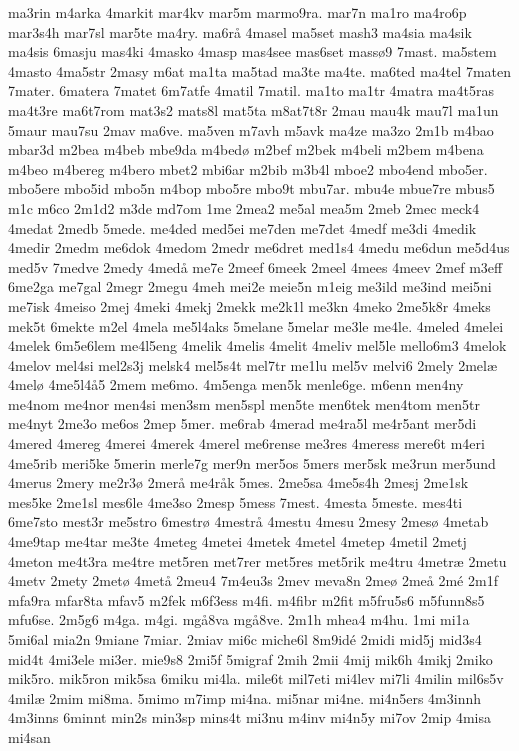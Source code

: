{ma3rin
m4arka
4markit
mar4kv
mar5m
marmo9ra.
mar7n
ma1ro
ma4ro6p
mar3s4h
mar7sl
mar5te
ma4ry.
ma6rå
4masel
ma5set
mash3
ma4sia
ma4sik
ma4sis
6masju
mas4ki
4masko
4masp
mas4see
mas6set
massø9
7mast.
ma5stem
4masto
4ma5str
2masy
m6at
ma1ta
ma5tad
ma3te
ma4te.
ma6ted
ma4tel
7maten
7mater.
6matera
7matet
6m7atfe
4matil
7matil.
ma1to
ma1tr
4matra
ma4t5ras
ma4t3re
ma6t7rom
mat3s2
mats8l
mat5ta
m8at7t8r
2mau
mau4k
mau7l
ma1un
5maur
mau7su
2mav
ma6ve.
ma5ven
m7avh
m5avk
ma4ze
ma3zo
2m1b
m4bao
mbar3d
m2bea
m4beb
mbe9da
m4bedø
m2bef
m2bek
m4beli
m2bem
m4bena
m4beo
m4bereg
m4bero
mbet2
mbi6ar
m2bib
m3b4l
mboe2
mbo4end
mbo5er.
mbo5ere
mbo5id
mbo5n
m4bop
mbo5re
mbo9t
mbu7ar.
mbu4e
mbue7re
mbus5
m1c
m6co
2m1d2
m3de
md7om
1me
2mea2
me5al
mea5m
2meb
2mec
meck4
4medat
2medb
5mede.
me4ded
med5ei
me7den
me7det
4medf
me3di
4medik
4medir
2medm
me6dok
4medom
2medr
me6dret
med1s4
4medu
me6dun
me5d4us
med5v
7medve
2medy
4medå
me7e
2meef
6meek
2meel
4mees
4meev
2mef
m3eff
6me2ga
me7gal
2megr
2megu
4meh
mei2e
meie5n
m1eig
me3ild
me3ind
mei5ni
me7isk
4meiso
2mej
4meki
4mekj
2mekk
me2k1l
me3kn
4meko
2me5k8r
4meks
mek5t
6mekte
m2el
4mela
me5l4aks
5melane
5melar
me3le
me4le.
4meled
4melei
4melek
6m5e6lem
me4l5eng
4melik
4melis
4melit
4meliv
mel5le
mello6m3
4melok
4melov
mel4si
mel2s3j
melsk4
mel5s4t
mel7tr
me1lu
mel5v
melvi6
2mely
2melæ
4melø
4me5l4å5
2mem
me6mo.
4m5enga
men5k
menle6ge.
m6enn
men4ny
me4nom
me4nor
men4si
men3sm
men5spl
men5te
men6tek
men4tom
men5tr
me4nyt
2me3o
me6os
2mep
5mer.
me6rab
4merad
me4ra5l
me4r5ant
mer5di
4mered
4mereg
4merei
4merek
4merel
me6rense
me3res
4meress
mere6t
m4eri
4me5rib
meri5ke
5merin
merle7g
mer9n
mer5os
5mers
mer5sk
me3run
mer5und
4merus
2mery
me2r3ø
2merå
me4råk
5mes.
2me5sa
4me5s4h
2mesj
2me1sk
mes5ke
2me1sl
mes6le
4me3so
2mesp
5mess
7mest.
4mesta
5meste.
mes4ti
6me7sto
mest3r
me5stro
6mestrø
4mestrå
4mestu
4mesu
2mesy
2mesø
4metab
4me9tap
me4tar
me3te
4meteg
4metei
4metek
4metel
4metep
4metil
2metj
4meton
me4t3ra
me4tre
met5ren
met7rer
met5res
met5rik
me4tru
4metræ
2metu
4metv
2mety
2metø
4metå
2meu4
7m4eu3s
2mev
meva8n
2meø
2meå
2mé
2m1f
mfa9ra
mfar8ta
mfav5
m2fek
m6f3ess
m4fi.
m4fibr
m2fit
m5fru5s6
m5funn8s5
mfu6se.
2m5g6
m4ga.
m4gi.
mgå8va
mgå8ve.
2m1h
mhea4
m4hu.
1mi
mi1a
5mi6al
mia2n
9miane
7miar.
2miav
mi6c
miche6l
8m9idé
2midi
mid5j
mid3s4
mid4t
4mi3ele
mi3er.
mie9s8
2mi5f
5migraf
2mih
2mii
4mij
mik6h
4mikj
2miko
mik5ro.
mik5ron
mik5sa
6miku
mi4la.
mile6t
mil7eti
mi4lev
mi7li
4milin
mil6s5v
4milæ
2mim
mi8ma.
5mimo
m7imp
mi4na.
mi5nar
mi4ne.
mi4n5ers
4m3innh
4m3inns
6minnt
min2s
min3sp
mins4t
mi3nu
m4inv
mi4n5y
mi7ov
2mip
4misa
mi4san
}
